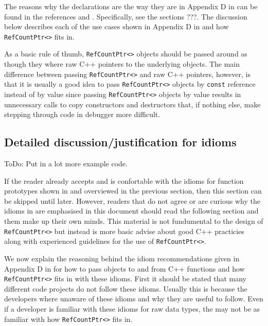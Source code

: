 The reasons why the declarations are the way they are in Appendix D in
{}\cite{ref:RefCountPtrBeginnersGuide} can be found in the references
{}\cite{ref:stroustrup_2000} and {}\cite{ref:meyers_1994}.
Specifically, see the sections ???.  The discussion below describes
each of the use cases shown in Appendix D in
{}\cite{ref:RefCountPtrBeginnersGuide} and how
{}\texttt{Ref\-Count\-Ptr<>} fits in.

As a basic rule of thumb, {}\texttt{Ref\-Count\-Ptr<>} objects should
be passed around as though they where raw C++ pointers to the
underlying objects.  The main difference between passing
{}\texttt{Ref\-Count\-Ptr<>} and raw C++ pointers, however, is that it
is usually a good idea to pass {}\texttt{Ref\-Count\-Ptr<>} objects by
{}\texttt{const} reference instead of by value since passing
{}\texttt{Ref\-Count\-Ptr<>} objects by value results in unnecessary
calls to copy constructors and destructors that, if nothing else, make
stepping through code in debugger more difficult.

%
\subsection{Detailed discussion/justification for idioms}
%

ToDo: Put in a lot more example code.

If the reader already accepts and is confortable with the idioms for
function prototypes shown in {}\cite[Appendix
D]{ref:RefCountPtrBeginnersGuide} and overviewed in the previous
section, then this section can be skipped until later.  However,
readers that do not agree or are curious why the idioms in
{}\cite[Appendix D]{ref:RefCountPtrBeginnersGuide} are emphasised in
this document should read the following section and them make up their
own minds.  This material is not fundumental to the design of
{}\texttt{Ref\-Count\-Ptr<>} but instead is more basic advise about
good C++ practicies along with experienced guidelines for the use of
{}\texttt{Ref\-Count\-Ptr<>}.

We now explain the reasoning behind the idiom recommendations given in
Appendix D in {}\cite{ref:RefCountPtrBeginnersGuide} for how to pass
objects to and from C++ functions and how {}\texttt{Ref\-Count\-Ptr<>}
fits in with these idioms.  First it should be stated that many
different code projects do not follow these idioms.  Usually this is
because the developers where unaware of these idioms and why they are
useful to follow.  Even if a developer is familiar with these idioms
for raw data types, the may not be as familiar with how
{}\texttt{Ref\-Count\-Ptr<>} fits in.

